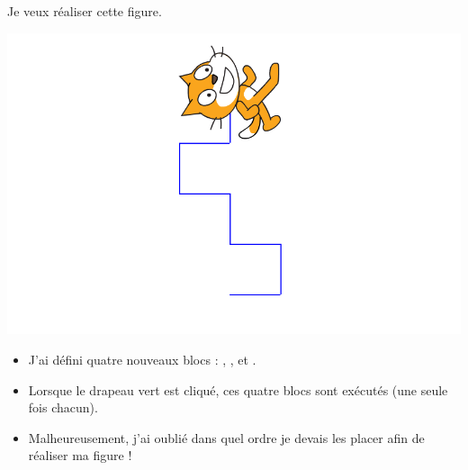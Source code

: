 \documentclass[class=report,crop=false, 12pt]{standalone}
\begin{document}


\begin{enigme}

Je veux réaliser cette figure.
\begin{center}
  \includegraphics[scale=\scaleecran,scale=1.2]{ecran-11-eg1} 
\end{center}

\begin{minipage}{0.49\textwidth}
\begin{itemize}
  \item J'ai défini quatre nouveaux blocs : 
  ,  ,   et  .

\bigskip
  
  \item Lorsque le drapeau vert est cliqué, ces quatre blocs sont exécutés (une seule fois chacun).
  
\bigskip
  
  \item Malheureusement, j'ai oublié dans quel ordre je devais les placer afin de réaliser ma figure !
  

\end{itemize}
\end{minipage}
\end{enigme}
\end{document}
